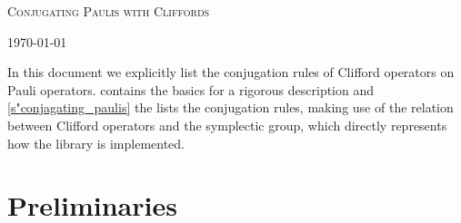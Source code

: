 \documentclass[a4paper,english]{scrartcl}
\begin{document}
\thispagestyle{plain}
\vspace*{-1cm}
\noindent%
\begin{minipage}[t]{.7\textwidth}
  {\LARGE\scshape Conjugating Paulis with Cliffords}\\[0.2em]
\end{minipage}%
\begin{minipage}[t]{0.3\textwidth}
  \strut\hfill%
  \today%
\end{minipage}%

\tableofcontents


In this document we explicitly list the conjugation rules of Clifford operators on Pauli
operators.  contains the basics for a rigorous description and
\cref{s"conjagating_paulis} the lists the conjugation rules, making use of the relation
between Clifford operators and the symplectic group, which directly represents how the
library is implemented.

\section{Preliminaries}\label{s"preliminaries}
\end{document}
